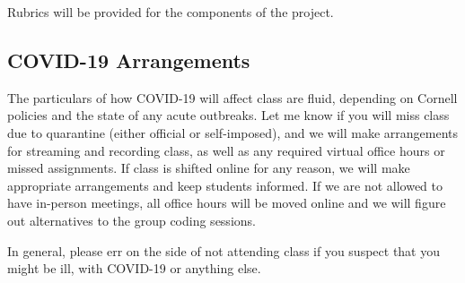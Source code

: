 \documentclass[
  letterpaper,
  DIV=11,
  numbers=noendperiod]{scrartcl}
\begin{document}
Rubrics will be provided for the components of the project.

\hypertarget{covid-19-arrangements}{%
\subsection{COVID-19 Arrangements}\label{covid-19-arrangements}}

The particulars of how COVID-19 will affect class are fluid, depending
on Cornell policies and the state of any acute outbreaks. Let me know if
you will miss class due to quarantine (either official or self-imposed),
and we will make arrangements for streaming and recording class, as well
as any required virtual office hours or missed assignments. If class is
shifted online for any reason, we will make appropriate arrangements and
keep students informed. If we are not allowed to have in-person
meetings, all office hours will be moved online and we will figure out
alternatives to the group coding sessions.

In general, please err on the side of not attending class if you suspect
that you might be ill, with COVID-19 or anything else.
\end{document}
